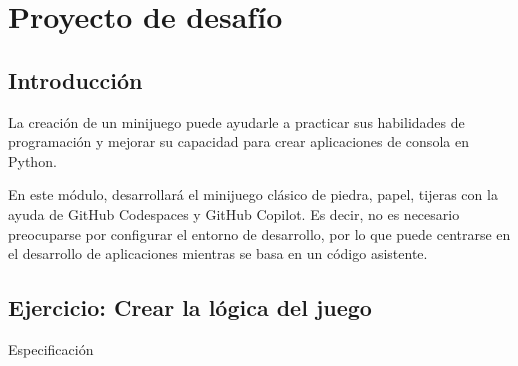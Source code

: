 \section{Proyecto de desafío}


\subsection{Introducción}

La creación de un minijuego puede ayudarle a practicar sus habilidades de programación y mejorar 
su capacidad para crear aplicaciones de consola en Python.

En este módulo, desarrollará el minijuego clásico de piedra, papel, tijeras con la ayuda de 
GitHub Codespaces y GitHub Copilot. Es decir, no es necesario preocuparse por configurar el 
entorno de desarrollo, por lo que puede centrarse en el desarrollo de aplicaciones mientras 
se basa en un código asistente.


\subsection{Ejercicio: Crear la lógica del juego}

Especificación

